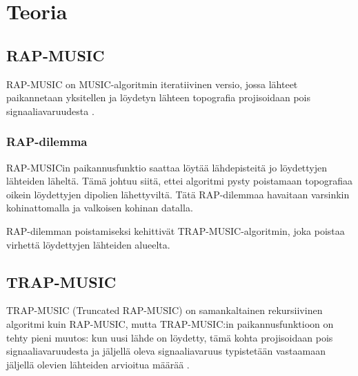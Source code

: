 \section{Teoria}





\subsection{RAP-MUSIC}
RAP-MUSIC on MUSIC-algoritmin iteratiivinen versio, jossa lähteet paikannetaan yksitellen ja löydetyn lähteen topografia projisoidaan pois signaaliavaruudesta \citep{Mosher1999SourceMUSIC}. 

\subsubsection{RAP-dilemma}
RAP-MUSICin paikannusfunktio saattaa löytää lähdepisteitä jo löydettyjen lähteiden läheltä. Tämä johtuu siitä, ettei algoritmi pysty poistamaan topografiaa oikein löydettyjen dipolien lähettyviltä. Tätä RAP-dilemmaa havaitaan varsinkin kohinattomalla ja valkoisen kohinan datalla. \citep{Makela2018TruncatedLocalization} 

RAP-dilemman poistamiseksi \cite{Makela2018TruncatedLocalization} kehittivät TRAP-MUSIC-algoritmin, joka poistaa virhettä löydettyjen lähteiden alueelta.

\subsection{TRAP-MUSIC}
TRAP-MUSIC (Truncated RAP-MUSIC) on samankaltainen rekursiivinen algoritmi kuin RAP-MUSIC, mutta TRAP-MUSIC:in paikannusfunktioon on tehty pieni muutos: kun uusi lähde on löydetty, tämä kohta projisoidaan pois signaaliavaruudesta ja jäljellä oleva signaaliavaruus typistetään vastaamaan jäljellä olevien lähteiden arvioitua määrää \citep{Makela2018TruncatedLocalization}.